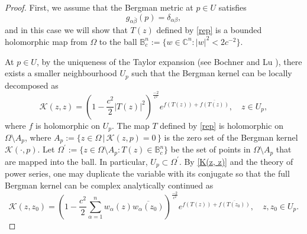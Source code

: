 \documentclass[12pt] {article}
\numberwithin{equation}{section}
\begin{document}
\begin{proof}


First, we assume that the Bergman metric at $p \in U$ 
  satisfies
    \begin{equation} \label{nor}
  g_{\alpha \bar \beta} (p) =\delta_{\alpha  \beta },
\end{equation} 
and in this case we will show that  $T (z) $ defined by \eqref{rep}  
is a bounded holomorphic map from $ \Omega $ to the ball 
$ \mathbb B_c^n := \{ w \in \mathbb C^n:   |w|^2 < {2}{c^{-2}} \}$.


 \medskip
 

   
 At $p \in U$, by the uniqueness of the Taylor expansion (see Bochner \cite{Bo47} and Lu \cite[Lemma 3]{Lu}), there exists a smaller neighbourhood $U_p$ such that the Bergman kernel can be locally decomposed as
\begin{equation}  \label{K(z, z)}
\mathcal{K}(z, z)=  \left (1 - \frac{c^2}{2} |T(z)|^2 \right )^{\frac{-2}{c^2}} e^{f(T(z))+\overline{f(T(z))}}, \quad z\in U_p,
\end{equation}
where $f$ is holomorphic on $U_p$.
The map $T$ defined by \eqref{rep} is holomorphic on $\Omega \setminus A_p$, where $A_p:=\{z\in \Omega \, | \,\mathcal{K}(z, p) =0 \, \}$ is the zero set of the Bergman kernel $\mathcal K(\cdot , p)$.
Let  $\Omega^{\prime}:= \{z \in \Omega \setminus A_p : T(z) \in \mathbb B_c^n \}$ be the set of points in $\Omega \setminus A_p$ that are mapped into the ball.  In particular, $U_p \subset \Omega^{\prime}$. By \eqref{K(z, z)} and the theory of power series, one may duplicate the variable with its conjugate so that  the full Bergman kernel can be complex analytically continued as
 $$
\mathcal{K}(z, {z_0})= \left (1 - \frac{c^2}{2} \sum_{\alpha=1}^n  w_\alpha(z)     \overline {w_\alpha(z_0)}   \right )^{\frac{-2}{c^2}}   e^{f(T(z))+\overline{f(T({z_0}))}}, \quad z, z_0\in U_p.
 $$
 

\end{proof}
\end{document}
